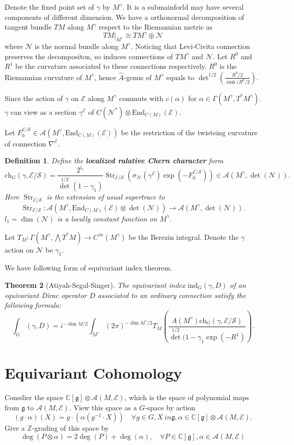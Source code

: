 \documentclass[11pt]{amsart}
\newtheorem{Thm}{Theorem}
\newtheorem{Def}[Thm]{Definition}
\def\cA{{\mathcal{A}}}
\def\cN{{\mathcal{N}}}
\def\cE{{\mathcal{E}}}
\def\cS{{\mathcal{S}}}
\def\bC{{\mathbb{C}}}
\def\bZ{{\mathbb{Z}}}
\def\fgg{{\mathfrak{g}}}
\def\bZ{{\mathbb{Z}}}
\def\End{{\mathrm{End}}}
\def\Str{\mathop{\mathrm{Str}}}
\def\kw#1{{\bf \em #1}}
\def\ch{\mathrm{ch}}
\def\Ah{{\hat{A}}}
\def\ind{\mathrm{ind}}
\def\Mr{M^{\gamma}}
\begin{document}
Denote the fixed point set of $\gamma$ by $M^\gamma$. It is a submainforld 
may have several components of different dimension. We have a orthonormal
decomposition
of tangent bundle $TM$ along $M^\gamma$ respect to the Riemannian metric as
\[
TM|_{M^\gamma} \cong T\Mr \oplus \cN
\]
where $\cN$ is the normal bundle along $\Mr$. 
Noticing that Levi-Civita connection preserves the decompositon, so 
induces connections of $T\Mr$ and $\cN$. Let $R^0$ and $R^1$ be the curvature
associated to these connections respectively. $R^0$ is the Riemannian curvature
of $M^\gamma$, 
hence $\Ah$-genus of $M^\gamma$ 
equals to $\det^{1/2}\left(\frac{R^0/2}{\sinh(R^0/2}\right)$.

Since the action of $\gamma$ on $\cE$ along $M^\gamma$ commuts with 
$c(\alpha)$ for $\alpha\in \Gamma(\Mr,T^*\Mr)$. $\gamma$ can view as a 
section $\gamma^\cE$ of $C(\cN^*)\otimes \End_{C(M)}(\cE)$.

Let $F_0^{\cE/\cS}\in \cA(M^\gamma,\End_{C(M)}(\cE))$ be the restriction of the twisteing curvature of
connection $\nabla^\cE$. 
\begin{Def}
Define the \kw{localized ralative Chern character} form
\[
\ch_G(\gamma, \cE/\cS) = \frac{2^{l_1}}{\det^{1/2}(1-\gamma_1)}
\Str_{\cE/\cS}(\sigma_{\cN}(\gamma^\cE)\exp(-F_0^{\cE/\cS})) \in \cA(M^\gamma,\det(\cN)).
\]
Here $\Str_{\cE/\cS}$ is the extension of usual supertrace to 
\[
\Str_{\cE/\cS}\colon \cA(\Mr, \End_{C(M)}(\cE)\otimes \det(\cN))
\to \cA(\Mr,\det(\cN)).
\]
$l_1 = \dim(\cN)$ is a locally constant function on $\Mr$. 
\end{Def}

Let $T_M\colon \Gamma(\Mr, \bigwedge T^*M) \to C^{\infty}(\Mr)$ be the 
Berezin integral. Denote the $\gamma$ action on $\cN$ be $\gamma_1$.

We have following form of equivariant index theorem.
\begin{Thm}[Atiyah-Segal-Singer]
The equivariant index $\ind_G(\gamma,D)$ of an equivariant Dirac operator $D$
associated to an ordinary connection satisfy the following formula:
\[
\int_G(\gamma, D) = i^{-\dim M/2}\int_{\Mr}(2\pi)^{-\dim \Mr/2} T_M
\left(\frac{\Ah(\Mr)\ch_G(\gamma,\cE/\cS)}{\det^{1/2}
(1-\gamma_1\exp(-R^1)}\right).
\]
\end{Thm}

\section{Equivariant Cohomology}

Consdier the space $\bC[\fgg]\otimes \cA(M,\cE)$, which is the space of polynomial maps from $\fgg$ to $\cA(M,\cE)$. View this space as a $G$-space by action
\[
(g\cdot \alpha)(X) = g\cdot (\alpha (g^{-1}\cdot X)) \quad \forall g\in G,
X\ in \fgg, \alpha \in \bC[\fgg]\otimes \cA(M,\cE).
\]
Give a $\bZ$-grading of this space by 
\[
\deg(P\otimes \alpha) = 2\deg(P)+\deg(\alpha), 
\quad \forall P\in \bC[\fgg], \alpha \in \cA(M,\cE)
\]
\end{document}
